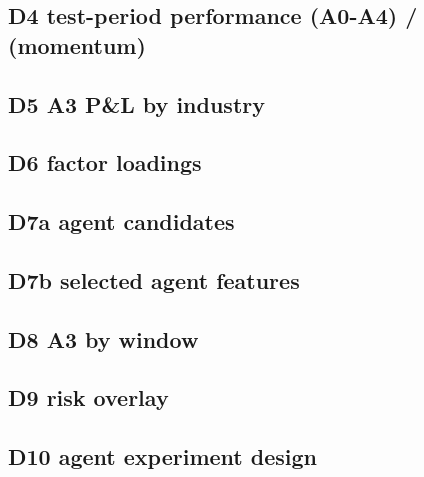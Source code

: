 \subsection*{D4 test-period performance \hfill \tagc (A0-A4) / \tagp (momentum)}
{\footnotesize\setlength{\tabcolsep}{4pt}}\par
\medskip
\subsection*{D5 A3 P\&L by industry \hfill \tagp}
{\footnotesize\setlength{\tabcolsep}{4pt}}\par
\medskip
\subsection*{D6 factor loadings \hfill \tagc}
{\footnotesize\setlength{\tabcolsep}{4pt}}\par
\medskip
\subsection*{D7a agent candidates \hfill \tagp}
{\footnotesize\setlength{\tabcolsep}{4pt}}\par
\medskip
\subsection*{D7b selected agent features \hfill \tagp}
{\footnotesize\setlength{\tabcolsep}{4pt}}\par
\medskip
\subsection*{D8 A3 by window \hfill \tagc}
{\footnotesize\setlength{\tabcolsep}{4pt}}\par
\medskip
\subsection*{D9 risk overlay \hfill \tagp}
{\footnotesize\setlength{\tabcolsep}{4pt}}\par
\medskip
\subsection*{D10 agent experiment design \hfill \tagc}
{\footnotesize\setlength{\tabcolsep}{4pt}}\par
\medskip
